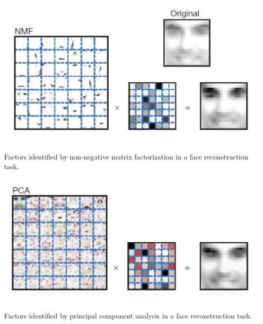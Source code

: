\begin{marginfigure}
    \centering
    \includegraphics[width=\textwidth]{figures/nmf_face}
    \caption{Factors identified by non-negative matrix factorization in a face reconstruction task.}
    \label{fig:nmf}
\end{marginfigure}

\begin{marginfigure}
    \centering
    \includegraphics[width=\textwidth]{figures/pca_face}
    \caption{Factors identified by principal component analysis in a face reconstruction task.}
    \label{fig:pca}
\end{marginfigure}

